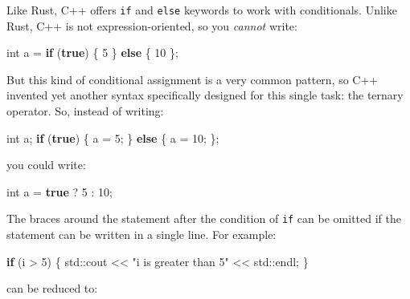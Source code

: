 \documentclass[
]{book}
\newenvironment{Shaded}{\begin{snugshade}}{\end{snugshade}}
\newcommand{\BuiltInTok}[1]{#1}
\newcommand{\ControlFlowTok}[1]{\textcolor[rgb]{0.13,0.29,0.53}{\textbf{#1}}}
\newcommand{\DataTypeTok}[1]{\textcolor[rgb]{0.13,0.29,0.53}{#1}}
\newcommand{\DecValTok}[1]{\textcolor[rgb]{0.00,0.00,0.81}{#1}}
\newcommand{\KeywordTok}[1]{\textcolor[rgb]{0.13,0.29,0.53}{\textbf{#1}}}
\newcommand{\NormalTok}[1]{#1}
\newcommand{\StringTok}[1]{\textcolor[rgb]{0.31,0.60,0.02}{#1}}
\begin{document}
Like Rust, C++ offers \texttt{if} and \texttt{else} keywords to work with conditionals. Unlike Rust, C++ is not expression-oriented, so you \emph{cannot} write:

\begin{Shaded}
\begin{Highlighting}[]
\DataTypeTok{int}\NormalTok{ a = }\ControlFlowTok{if}\NormalTok{ (}\KeywordTok{true}\NormalTok{) \{ }\DecValTok{5}\NormalTok{ \} }\ControlFlowTok{else}\NormalTok{ \{ }\DecValTok{10}\NormalTok{ \};}
\end{Highlighting}
\end{Shaded}

But this kind of conditional assignment is a very common pattern, so C++ invented yet another syntax specifically designed for this single task: the ternary operator. So, instead of writing:

\begin{Shaded}
\begin{Highlighting}[]
\DataTypeTok{int}\NormalTok{ a;}
\ControlFlowTok{if}\NormalTok{ (}\KeywordTok{true}\NormalTok{) \{ a = }\DecValTok{5}\NormalTok{; \} }\ControlFlowTok{else}\NormalTok{ \{ a = }\DecValTok{10}\NormalTok{; \};}
\end{Highlighting}
\end{Shaded}

you could write:

\begin{Shaded}
\begin{Highlighting}[]
\DataTypeTok{int}\NormalTok{ a = }\KeywordTok{true}\NormalTok{ ? }\DecValTok{5}\NormalTok{ : }\DecValTok{10}\NormalTok{;}
\end{Highlighting}
\end{Shaded}

The braces around the statement after the condition of \texttt{if} can be omitted if the statement can be written in a single line.
For example:

\begin{Shaded}
\begin{Highlighting}[]
\ControlFlowTok{if}\NormalTok{ (i \textgreater{} }\DecValTok{5}\NormalTok{) \{}
    \BuiltInTok{std::}\NormalTok{cout \textless{}\textless{} }\StringTok{"i is greater than 5"}\NormalTok{ \textless{}\textless{} }\BuiltInTok{std::}\NormalTok{endl;}
\NormalTok{\}}
\end{Highlighting}
\end{Shaded}

can be reduced to:
\end{document}
